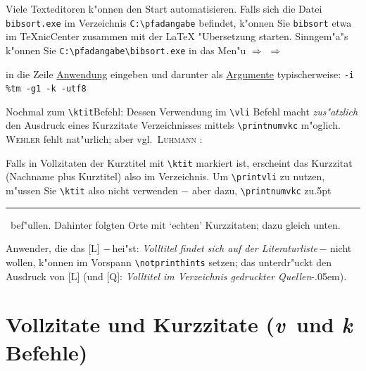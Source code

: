 \documentclass[12pt,a4paper]{article}
\newcommand{\pdfko}[1]{\kern #1pt
                              \rule[-0.4ex]{0.8pt}{0ex}\kern -0.8pt
                          \strut\ignorespaces}%
\begin{document}
 \vspace{1ex}\noindent 
 Viele Texteditoren k"onnen den Start automatisieren. Falls sich die Datei
 \verb|bibsort.exe| im Verzeichnis \verb|C:\pfadangabe| befindet, k"onnen
 Sie \verb|bibsort| etwa im \TeX nicCenter zusammen mit der \LaTeX\hy
 "Ubersetzung starten. Sinngem"a"s k"onnen Sie
 \verb|C:\pfadangabe\bibsort.exe| in das Men"u  $\Rightarrow$
  $\Rightarrow$
 \rule[-1.75ex]{0mm}{0mm} in die Zeile
 \underline{Anwendung} eingeben und darunter als \underline{Argumente}
 typischerweise: \hspace{.25em}\verb|-i %tm -g1 -k -utf8|
 
 \vspace{2.75ex}\noindent 
 Nochmal zum \verb|\ktit|\hy Befehl: Dessen Verwendung im \verb|\vli|\hy
 Befehl macht \textit{zus"atzlich} den Ausdruck eines Kurzzitate\hy
 Verzeichnisses mittels \verb|\printnumvkc| m"oglich. \textsc{Wehler} fehlt
 nat"urlich; aber vgl.\ \textsc{Luhmann} :

 \vspace{1.5ex}\label{vkc}{\footnotesize \batwocolitemdefs\printnumvkclist}

 \newpage
 \noindent
 Falls in Vollzitaten der Kurztitel mit \verb|\ktit| markiert ist, erscheint
 das Kurzzitat (Nachname plus Kurztitel) also im Verzeichnis. Um
 \verb|\printvli| zu nutzen, m"ussen Sie \verb|\ktit| also nicht verwenden
 $-$ aber dazu, \verb|\printnumvkc| zu\pdfko{.5}\ 
 bef"ullen. Dahinter folgten Orte mit `echten' Kurzzitaten; dazu gleich unten.

 Anwender, die das [L] $-$\,hei"st: \textit{Volltitel findet sich auf der
 Literaturliste}\,$-$ nicht wollen, k"onnen im Vorspann
 \verb|\notprinthints| setzen; das unterdr"uckt den Ausdruck von [L]
 \hspace{.2em}(und [Q]: \hspace{-.05em}\textit{Volltitel im Verzeichnis
 gedruckter Quellen}\kern-.05em).


\section{Vollzitate und Kurzzitate (\ko\textit{v}\hy\ und \textit{k}\fhy
         Befehle)}\label{Sect1}
\end{document}
